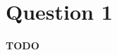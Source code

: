 \documentclass[a4paper]{article}
\begin{document}
\section*{Question 1} 
\textbf{TODO}\\

\end{document}
